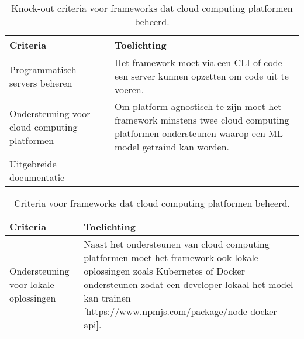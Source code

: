 
\begin{table}[hbt!]
  \centering
  \begin{tabular}{|p{.2\linewidth}|p{.69\linewidth}|}
  \hline
  \textbf{Criteria} & \textbf{Toelichting} \\ \hline
    Programmatisch servers beheren
    &
    Het framework moet via een CLI of code een server kunnen opzetten om code uit te voeren. 
    \\ \hline

    Ondersteuning voor cloud \newline computing \newline platformen
    &
    Om platform-agnostisch te zijn moet het framework minstens twee cloud computing platformen ondersteunen waarop een ML model getraind kan worden.
    \\ \hline

    Uitgebreide documentatie
    &
    
    \\ \hline
  \end{tabular}
  \caption{Knock-out criteria voor frameworks dat cloud computing platformen beheerd.}
  \label{table:knock-out-criteria-framworks-that-manage-cloud-computing-platformen}
\end{table}

\begin{table}[hbt!]
  \centering
  \begin{tabular}{|p{.2\linewidth}|p{.69\linewidth}|}
  \hline
  \textbf{Criteria} & \textbf{Toelichting} \\ \hline
    Ondersteuning voor lokale \newline oplossingen
    &
    Naast het ondersteunen van cloud computing platformen moet het framework ook lokale oplossingen zoals Kubernetes of Docker ondersteunen zodat een developer lokaal het model kan trainen [https://www.npmjs.com/package/node-docker-api].
    \\ \hline
  \end{tabular}
  \caption{Criteria voor frameworks dat cloud computing platformen beheerd.}
  \label{table:criteria-framworks-that-manage-cloud-computing-platformen}
\end{table}



